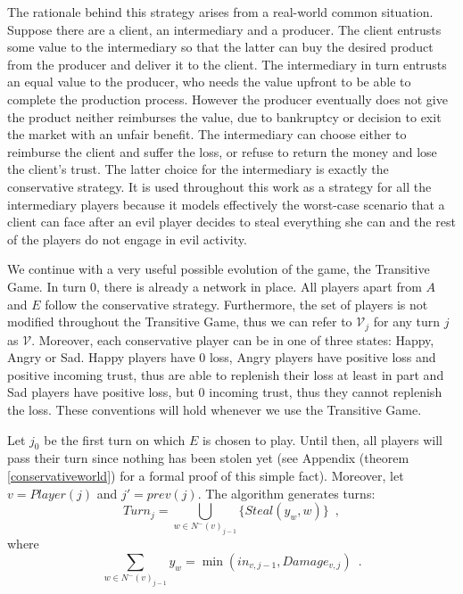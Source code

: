 \documentclass[11pt]{llncs}
\theoremstyle{definition}
\begin{document}
     The rationale behind this strategy arises from a real-world common situation. Suppose there are a client, an
     intermediary and a producer. The client entrusts some value to the intermediary so that the latter can buy the desired
     product from the producer and deliver it to the client. The intermediary in turn entrusts an equal value to the
     producer, who needs the value upfront to be able to complete the production process. However the producer eventually
     does not give the product neither reimburses the value, due to bankruptcy or decision to exit the market with an unfair
     benefit. The intermediary can choose either to reimburse the client and suffer the loss, or refuse to return the money
     and lose the client's trust. The latter choice for the intermediary is exactly the conservative strategy. It is used
     throughout this work as a strategy for all the intermediary players because it models effectively the worst-case
     scenario that a client can face after an evil player decides to steal everything she can and the rest of the players do
     not engage in evil activity.

     We continue with a very useful possible evolution of the game, the Transitive Game. In turn 0, there is already a network
     in place. All players apart from $A$ and $E$ follow the conservative strategy. Furthermore, the set of players is not
     modified throughout the Transitive Game, thus we can refer to $\mathcal{V}_j$ for any turn $j$ as $\mathcal{V}$.
     Moreover, each conservative player can be in one of three states: Happy, Angry or Sad. Happy players have 0 loss, Angry
     players have positive loss and positive incoming trust, thus are able to replenish their loss at least in part and
     Sad players have positive loss, but 0 incoming trust, thus they cannot replenish the loss. These conventions will hold
     whenever we use the Transitive Game.

     Let $j_0$ be the first turn on which $E$ is chosen to play. Until then, all players will pass their turn since nothing
     has been stolen yet (see Appendix (theorem \ref{conservativeworld}) for a formal proof of this simple fact). Moreover,
     let $v = Player(j)$ and $j' = prev\left(j\right)$.
     The algorithm generates turns:
     \begin{equation}
        Turn_j = \bigcup\limits_{w \in N^{-}\left(v\right)_{j-1}}\{Steal\left(y_w,w\right)\} \enspace,%
     \end{equation}
     where
     \begin{equation*}
        \sum\limits_{w \in N^{-}\left(v\right)_{j-1}}y_w = \min\left(in_{v, j-1}, Damage_{v, j}\right) \enspace.
     \end{equation*}
 
\end{document}
